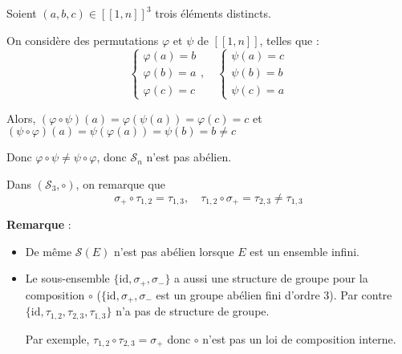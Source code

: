 \begin{myproof}{}{}
  Soient $(a,b,c) \in [\![1,n ]\!] ^{3}$ trois éléments distincts. 

  On considère des permutations $\varphi$ et $\psi$ de $[\![1,n]\!]$, telles que :
  \begin{equation}
    \begin{cases}
        \varphi(a) = b \\ 
        \varphi(b) = a \\ 
        \varphi(c) = c
    \end{cases}, \quad \begin{cases}
      \psi(a) = c \\ 
      \psi(b) = b \\ 
      \psi(c) = a
    \end{cases}
  \end{equation} 

  Alors, $(\varphi \circ \psi)(a) = \varphi(\psi(a)) = \varphi(c) = c$ et $(\psi \circ \varphi)(a) = \psi(\varphi(a)) = \psi(b) = b \ne c$ 

  Donc $\varphi \circ \psi \ne \psi \circ \varphi$, donc $\mathscr{S}_n$ n'est pas abélien.
\end{myproof}



\begin{Example}{}{}
Dans $(\mathscr{S}_3, \circ)$, on remarque que 
\begin{equation}
  \sigma_+ \circ \tau _{1,2} = \tau _{1,3}, \quad \tau _{1,2} \circ \sigma_+ = \tau _{2,3} \ne \tau _{1,3}
\end{equation}
\end{Example}

\textbf{Remarque} : 
\begin{itemize}

    \item De même $\mathscr{S}(E)$ n'est pas abélien lorsque $E$ est un ensemble infini. 

    \item Le sous-ensemble $\{ \mathrm{id}, \sigma_+ , \sigma_- \}$ a aussi une structure de groupe pour la composition $\circ$ ($\{ \mathrm{id}, \sigma_+, \sigma_-$ est un groupe abélien fini d'ordre 3). Par contre $\{\mathrm{id}, \tau _{1,2}, \tau _{2,3}, \tau _{1,3}\}$ n'a pas de structure de groupe.

        Par exemple, $\tau _{1,2} \circ \tau _{2,3} = \sigma_+$ donc $\circ$ n'est pas un loi de composition interne.
\end{itemize}


